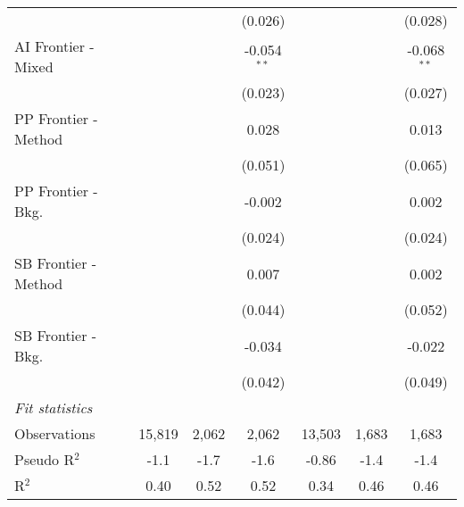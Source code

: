 \begin{tabular}{lcccccc}
                        &         &                & (0.026)       &              &              & (0.028)\\   
   AI Frontier - Mixed  &         &                & -0.054$^{**}$ &              &              & -0.068$^{**}$\\   
                        &         &                & (0.023)       &              &              & (0.027)\\   
   PP Frontier - Method &         &                & 0.028         &              &              & 0.013\\   
                        &         &                & (0.051)       &              &              & (0.065)\\   
   PP Frontier - Bkg.   &         &                & -0.002        &              &              & 0.002\\   
                        &         &                & (0.024)       &              &              & (0.024)\\   
   SB Frontier - Method &         &                & 0.007         &              &              & 0.002\\   
                        &         &                & (0.044)       &              &              & (0.052)\\   
   SB Frontier - Bkg.   &         &                & -0.034        &              &              & -0.022\\   
                        &         &                & (0.042)       &              &              & (0.049)\\   
   \midrule
   \emph{Fit statistics}\\
   Observations         & 15,819  & 2,062          & 2,062         & 13,503       & 1,683        & 1,683\\  
   Pseudo R$^2$         & -1.1    & -1.7           & -1.6          & -0.86        & -1.4         & -1.4\\  
   R$^2$                & 0.40    & 0.52           & 0.52          & 0.34         & 0.46         & 0.46\\  
   

\end{tabular}
